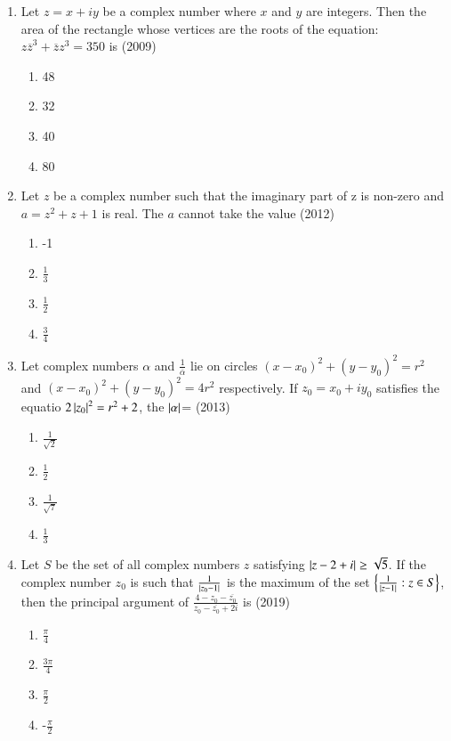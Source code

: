 \documentclass[journal,12pt,twocolumn]{IEEEtran}
\theoremstyle{remark}
\begin{document}
\begin{enumerate}
\item Let $z=x+iy$ be a complex number where $x$ and $y$ are integers. Then the area of the rectangle whose vertices are the roots of the equation: $z\overline{z}^{3}+\overline{z}z^{3}=350$ is \hfill{(2009)}
	\begin{multicols}{4}
\begin{enumerate}
	\item 48
	\item 32
	\item 40
	\item 80
\end{enumerate}
	\end{multicols}

\item Let $z$ be a complex number such that the imaginary part of z is non-zero and $a=z^{2}+z+1$ is real. The $a$ cannot take the value \hfill{(2012)}
	\begin{multicols}{4}
\begin{enumerate}
	\item -1
	\item $\frac{1}{3}$
	\item $\frac{1}{2}$
	\item $\frac{3}{4}$
\end{enumerate}
	\end{multicols}

\item Let complex numbers $\alpha$ and $\frac{1}{\overline{\alpha}}$ lie on circles $(x-x_{0})^{2}+(y-y_{0})^{2}=r^{2}$ and $(x-x_{0})^{2}+(y-y_{0})^{2}=4r^{2}$ respectively. If $z_{0}=x_{0}+iy_{0}$ satisfies the equatio  $2\left\vert z_{0}\right\vert ^{2}=r^{2}+2$, the $\left\vert\alpha\right\vert$= \hfill{(2013)}
	\begin{multicols}{4}
\begin{enumerate}
	\item $\frac{1}{\sqrt{2}}$
	\item $\frac{1}{2}$
	\item $\frac{1}{\sqrt{7}}$
	\item $\frac{1}{3}$
\end{enumerate}
	\end{multicols}

\item Let $S$ be the set of all complex numbers $z$ satisfying $\left\vert z-2+i\right\vert\geq\sqrt{5}$. If the complex number $z_{0}$ is such that $\frac{1}{\left\vert z_{0}-1\right\vert}$ is the maximum of the set  $\left\{\frac{1}{|z-1|} : z \in S\right\}$, then the principal argument of $\frac{4-z_{0}-\overline{z_{0}}}{z_{0}-\overline{z_{0}}+2i}$ is  \hfill{(2019)}
	\begin{multicols}{4}
\begin{enumerate}
	\item $\frac{\pi}{4}$
	\item $\frac{3\pi}{4}$
	\item $\frac{\pi}{2}$
	\item -$\frac{\pi}{2}$
\end{enumerate}
	\end{multicols}

\end{enumerate}
\end{document}
